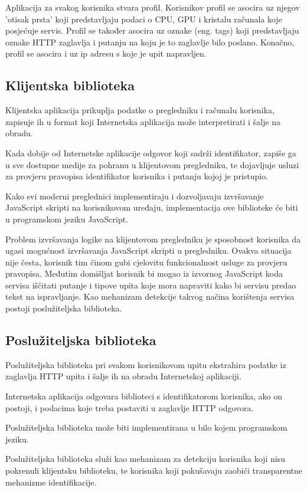 \documentclass[times, utf8, zavrsni]{fer}
\begin{document}
Aplikacija za svakog korisnika stvara profil. Korisnikov profil se asocira uz
njegov 'otisak prsta' koji predstavljaju podaci o CPU, GPU i kristalu računala
koje posjećuje servis. Profil se također asocira uz oznake (eng. tags) koji
predstavljaju oznake HTTP zaglavlja i putanju na koju je to zaglavlje bilo
poslano. Konačno, profil se asocira i uz ip adresu s koje je upit napravljen.

\subsection{Klijentska biblioteka}
Klijentska aplikacija prikuplja podatke o pregledniku i računalu korisnika,
zapisuje ih u format koji Internetska aplikacija može interpretirati i šalje na
obradu.

Kada dobije od Internetske aplikacije odgovor koji sadrži identifikator,
zapiše ga u sve dostupne medije za pohranu u klijentovom pregledniku, te
dojavljuje usluzi za provjeru pravopisa identifikator korisnika i putanju kojoj
je pristupio.

Kako svi moderni preglednici implementiraju i dozvoljavaju izvršavanje
JavaScript skripti na korisnikovom uređaju, implementacija ove biblioteke će
biti u programskom jeziku JavaScript.

Problem izvršavanja logike na klijentovom pregledniku je sposobnost korisnika
da ugasi mogućnost izvršavanja JavaScript skripti u pregledniku. Ovakva
situacija nije česta, korisnik tim činom gubi cjelovitu funkcionalnost
usluge za provjeru pravopisa. Međutim domišljat korisnik bi mogao iz izvornog
JavaScript koda servisa iščitati putanje i tipove upita koje mora napraviti kako
bi servisu predao tekst na ispravljanje. Kao mehanizam detekcije takvog načina
korištenja servisa postoji poslužiteljska biblioteka.

\subsection{Poslužiteljska biblioteka}
Poslužiteljska biblioteka pri svakom korisnikovom upitu ekstrahira podatke iz
zaglavlja HTTP upita i šalje ih na obradu Internetskoj aplikaciji.

Internetska aplikacija odgovara biblioteci s identifikatorom korisnika, ako
on postoji, i podacima koje treba postaviti u zaglavlje HTTP odgovora.

Poslužiteljska biblioteka može biti implementirana u bilo kojem programskom
jeziku.

Poslužiteljska biblioteka služi kao mehanizam za detekciju korisnika koji nisu
pokrenuli klijentsku biblioteku, te korisnika koji pokušavaju zaobići
transparentne mehanizme identifikacije.
\end{document}
